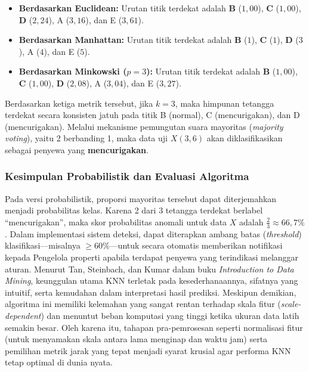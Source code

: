 \begin{itemize}
    \item \textbf{Berdasarkan Euclidean:} Urutan titik terdekat adalah \textbf{B} ($1{,}00$), \textbf{C} ($1{,}00$), \textbf{D} ($2{,}24$), A ($3{,}16$), dan E ($3{,}61$). 
    \item \textbf{Berdasarkan Manhattan:} Urutan titik terdekat adalah \textbf{B} ($1$), \textbf{C} ($1$), \textbf{D} ($3$), A ($4$), dan E ($5$).
    \item \textbf{Berdasarkan Minkowski ($p=3$):} Urutan titik terdekat adalah \textbf{B} ($1{,}00$), \textbf{C} ($1{,}00$), \textbf{D} ($2{,}08$), A ($3{,}04$), dan E ($3{,}27$).
\end{itemize}

Berdasarkan ketiga metrik tersebut, jika $k=3$, maka himpunan tetangga terdekat secara konsisten jatuh pada titik B (normal), C (mencurigakan), dan D (mencurigakan). Melalui mekanisme pemungutan suara mayoritas (\textit{majority voting}), yaitu 2 berbanding 1, maka data uji $X(3, 6)$ akan diklasifikasikan sebagai penyewa yang \textbf{mencurigakan}.

\subsubsection{Kesimpulan Probabilistik dan Evaluasi Algoritma}
Pada versi probabilistik, proporsi mayoritas tersebut dapat diterjemahkan menjadi probabilitas kelas. Karena 2 dari 3 tetangga terdekat berlabel ``mencurigakan'', maka skor probabilitas anomali untuk data $X$ adalah $\frac{2}{3} \approx 66{,}7\%$. Dalam implementasi sistem deteksi, dapat diterapkan ambang batas (\textit{threshold}) klasifikasi—misalnya $\geq 60\%$—untuk secara otomatis memberikan notifikasi kepada Pengelola properti apabila terdapat penyewa yang terindikasi melanggar aturan. Menurut Tan, Steinbach, dan Kumar  \cite{tan2019introduction} dalam buku \textit{Introduction to Data Mining}, keunggulan utama KNN terletak pada kesederhanaannya, sifatnya yang intuitif, serta kemudahan dalam interpretasi hasil prediksi. Meskipun demikian, algoritma ini memiliki kelemahan yang sangat rentan terhadap skala fitur (\textit{scale-dependent}) dan menuntut beban komputasi yang tinggi ketika ukuran data latih semakin besar. Oleh karena itu, tahapan pra-pemrosesan seperti normalisasi fitur (untuk menyamakan skala antara lama menginap dan waktu jam) serta pemilihan metrik jarak yang tepat menjadi syarat krusial agar performa KNN tetap optimal di dunia nyata.

